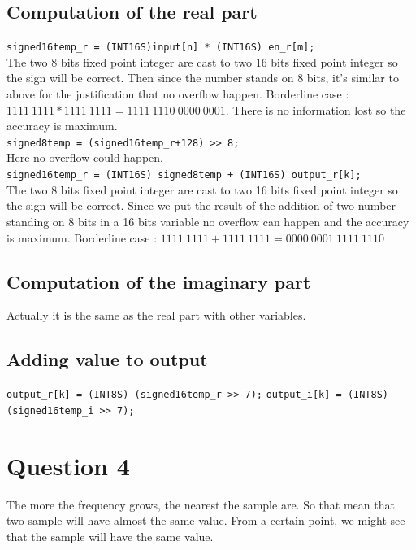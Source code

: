 \documentclass[a4paper]{article}
\begin{document}
\subsection{Computation of the real part}

\verb|signed16temp_r = (INT16S)input[n] * (INT16S) en_r[m];|
\\
The two 8 bits fixed point integer are cast to two 16 bits fixed point integer so the sign will be correct.
Then since the number stands on 8 bits, it's similar to above for the justification that no overflow happen. Borderline case :   $ 1111\ 1111 * 1111\ 1111 = 1111\ 1110\ 0000\ 0001 $. There is no information lost so the accuracy is maximum.
\\
\verb|signed8temp = (signed16temp_r+128) >> 8;|
\\
Here no overflow could happen. %
\\
\verb|signed16temp_r = (INT16S) signed8temp + (INT16S) output_r[k];|
\\
The two 8 bits fixed point integer are cast to two 16 bits fixed point integer so the sign will be correct.
Since we put the result of the addition of two number standing on 8 bits in a 16 bits variable no overflow can happen and the accuracy is maximum. Borderline case : $ 1111\ 1111 + 1111\ 1111 = 0000\ 0001\ 1111\ 1110 $

\subsection{Computation of the imaginary part}

Actually it is the same as the real part with other variables.

\subsection{Adding value to output}

\verb|output_r[k] = (INT8S) (signed16temp_r >> 7);|
\verb|output_i[k] = (INT8S) (signed16temp_i >> 7);|



\section{Question 4}
The more the frequency grows, the nearest the sample are. So that mean that two sample will have almost the same value. From a certain point, we might see that the sample will have the same value.

\end{document}
